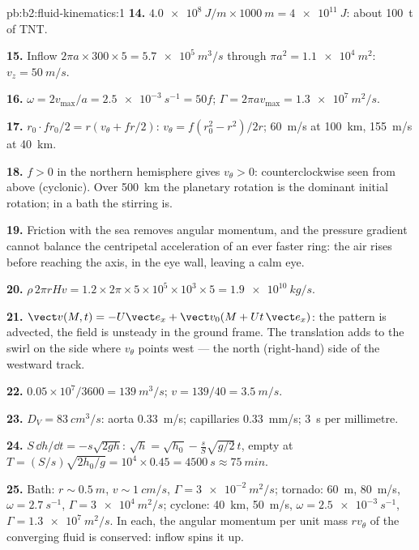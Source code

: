 \begin{solution}{pb:b2:fluid-kinematics:1}
\textbf{14.} $\qty{4.0e8}{J/m} \times \qty{1000}{m} = \qty{4e11}{J}$: about
\qty{100}{t} of TNT.

\textbf{15.} Inflow $2\pi a \times 300 \times 5 = \qty{5.7e5}{m^3/s}$ through
$\pi a^2 = \qty{1.1e4}{m^2}$: $v_z = \qty{50}{m/s}$.

\textbf{16.} $\omega = 2v_{\max}/a = \qty{2.5e-3}{s^{-1}} = 50f$; $\Gamma = 2\pi av_{\max}
= \qty{1.3e7}{m^2/s}$.

\textbf{17.} $r_0\cdot fr_0/2 = r(v_\theta + fr/2)$: $v_\theta = f(r_0^2 - r^2)/2r$;
\qty{60}{m/s} at \qty{100}{km}, \qty{155}{m/s} at \qty{40}{km}.

\textbf{18.} $f > 0$ in the northern hemisphere gives $v_\theta > 0$:
counterclockwise seen from above (cyclonic). Over \qty{500}{km} the
planetary rotation is the dominant initial rotation; in a bath the
stirring is.

\textbf{19.} Friction with the sea removes angular momentum, and the
pressure gradient cannot balance the centripetal acceleration of an
ever faster ring: the air rises before reaching the axis, in the eye
wall, leaving a calm eye.

\textbf{20.} $\rho\,2\pi rHv = 1.2 \times 2\pi \times 5 \times 10^5 \times 10^3 \times 5 =
\qty{1.9e10}{kg/s}$.

\textbf{21.} $\vect v(M, t) = -U\vect e_x + \vect v_0(M + Ut\,\vect e_x)$: the
pattern is advected, the field is unsteady in the ground frame.
The translation adds to the swirl on the side where $v_\theta$ points
west --- the north (right-hand) side of the westward track.

\textbf{22.} $0.05 \times 10^7/3600 = \qty{139}{m^3/s}$; $v = 139/40 = \qty{3.5}{m/s}$.

\textbf{23.} $D_V = \qty{83}{cm^3/s}$: aorta \qty{0.33}{m/s}; capillaries
\qty{0.33}{mm/s}; \qty{3}{s} per millimetre.

\textbf{24.} $S\,\dd h/\dd t = -s\sqrt{2gh}$: $\sqrt h = \sqrt{h_0} -
\frac sS\sqrt{g/2}\,t$, empty at $T = (S/s)\sqrt{2h_0/g} = 10^4 \times 0.45 =
\qty{4500}{s} \approx \qty{75}{min}$.

\textbf{25.} Bath: $r \sim \qty{0.5}{m}$, $v \sim \qty{1}{cm/s}$, $\Gamma =
\qty{3e-2}{m^2/s}$; tornado: \qty{60}{m}, \qty{80}{m/s}, $\omega = \qty{2.7}{s^{-1}}$,
$\Gamma = \qty{3e4}{m^2/s}$; cyclone: \qty{40}{km}, \qty{50}{m/s}, $\omega =
\qty{2.5e-3}{s^{-1}}$, $\Gamma = \qty{1.3e7}{m^2/s}$. In each, the angular
momentum per unit mass $rv_\theta$ of the converging fluid is conserved:
inflow spins it up.
\end{solution}

